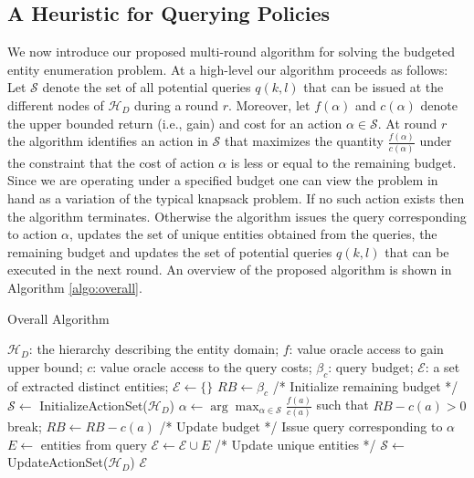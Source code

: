 \documentclass{vldb}
\newcommand{\hierarchy}{\mathcal{H}_D}
\newcommand{\uentities}{\mathcal{E}}
\begin{document}
\subsection{A Heuristic for Querying Policies}
We now introduce our proposed multi-round algorithm for solving the budgeted entity enumeration problem. At a high-level our algorithm proceeds as follows: Let $\mathcal{S}$ denote the set of all potential queries $q(k,l)$ that can be issued at the different nodes of $\hierarchy$ during a round $r$. Moreover, let $f(\alpha)$ and $c(\alpha)$ denote the upper bounded return (i.e., gain) and cost for an action $\alpha \in \mathcal{S}$. At round $r$ the algorithm identifies an action in $\mathcal{S}$ that maximizes the quantity $\frac{f(\alpha)}{c(\alpha)}$ under the constraint that the cost of action $\alpha$ is less or equal to the remaining budget. Since we are operating under a specified budget one can view the problem in hand as a variation of the typical knapsack problem. If no such action exists then the algorithm terminates. Otherwise the algorithm issues the query corresponding to action $\alpha$, updates the set of unique entities obtained from the queries, the remaining budget and updates the set of potential queries $q(k,l)$ that can be executed in the next round.  An overview of the proposed algorithm is shown in Algorithm \ref{algo:overall}.

\begin{algorithm}[h]
\caption{Overall Algorithm}
\label{algo:overall}
\begin{algorithmic}[1]
 $\hierarchy$: the hierarchy describing the entity domain; $f$: value oracle access to gain upper bound; $c$: value oracle access to the query costs; $\beta_c$: query budget;
 $\uentities$: a set of extracted distinct entities;
\STATE $\uentities \leftarrow \{\}$
\STATE $RB \leftarrow \beta_c$ /* Initialize remaining budget */
\STATE $\mathcal{S} \leftarrow$ {\sf InitializeActionSet($\hierarchy$)}
	\STATE $\alpha \leftarrow \arg\max_{\alpha \in {\mathcal{S}}} \frac{f(a)}{c(a)}$ such that $RB - c(a) >0$
		\STATE break;
	\ENDIF
	\STATE $RB \leftarrow RB - c(a)$ /* Update budget */
	\STATE Issue query corresponding to $\alpha$
	\STATE $E \leftarrow$ entities from query
	\STATE $\uentities \leftarrow \uentities \cup E$ /* Update unique entities */
	\STATE $\mathcal{S} \leftarrow$ {\sf UpdateActionSet($\hierarchy$)}
\ENDWHILE
\RETURN $\uentities$
\end{algorithmic}
\end{algorithm}
\end{document}
